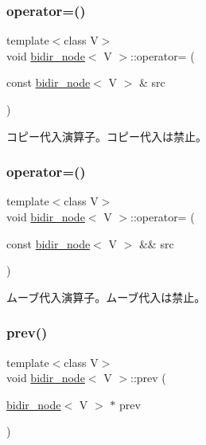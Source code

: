 \subsubsection{\texorpdfstring{operator=()}{operator=()}\hspace{0.1cm}{\footnotesize\ttfamily [1/2]}}
{\footnotesize\ttfamily template$<$class V$>$ \\
void \hyperlink{classbidir__node}{bidir\+\_\+node}$<$ V $>$\+::operator= (\begin{DoxyParamCaption}\item[{const \hyperlink{classbidir__node}{bidir\+\_\+node}$<$ V $>$ \&}]{src }\end{DoxyParamCaption})\hspace{0.3cm}{\ttfamily [delete]}}

コピー代入演算子。コピー代入は禁止。 \hypertarget{classbidir__node_a799804bad3c1554f9064ee77bbc46302}{}\label{classbidir__node_a799804bad3c1554f9064ee77bbc46302} 
\subsubsection{\texorpdfstring{operator=()}{operator=()}\hspace{0.1cm}{\footnotesize\ttfamily [2/2]}}
{\footnotesize\ttfamily template$<$class V$>$ \\
void \hyperlink{classbidir__node}{bidir\+\_\+node}$<$ V $>$\+::operator= (\begin{DoxyParamCaption}\item[{const \hyperlink{classbidir__node}{bidir\+\_\+node}$<$ V $>$ \&\&}]{src }\end{DoxyParamCaption})\hspace{0.3cm}{\ttfamily [delete]}}

ムーブ代入演算子。ムーブ代入は禁止。 \hypertarget{classbidir__node_a7864b76461d92f398efb90819854f67c}{}\label{classbidir__node_a7864b76461d92f398efb90819854f67c} 
\subsubsection{\texorpdfstring{prev()}{prev()}\hspace{0.1cm}{\footnotesize\ttfamily [1/2]}}
{\footnotesize\ttfamily template$<$class V$>$ \\
void \hyperlink{classbidir__node}{bidir\+\_\+node}$<$ V $>$\+::prev (\begin{DoxyParamCaption}\item[{\hyperlink{classbidir__node}{bidir\+\_\+node}$<$ V $>$ $\ast$}]{prev }\end{DoxyParamCaption})}

